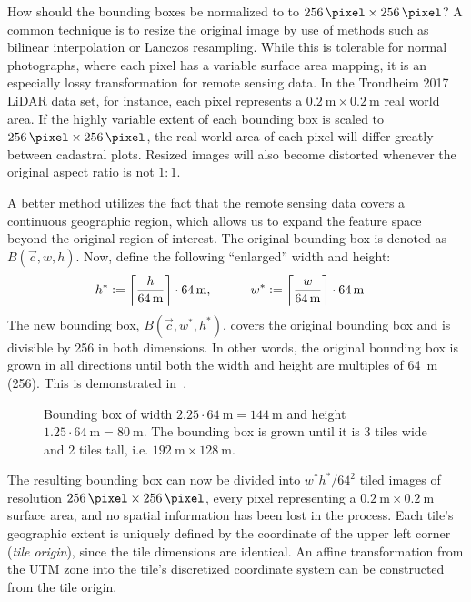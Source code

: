 How should the bounding boxes be normalized to to $\SI{256}{\pixel} \times \SI{256}{\pixel}$?
A common technique is to resize the original image by use of methods such as bilinear interpolation or Lanczos resampling.
While this is tolerable for normal photographs, where each pixel has a variable surface area mapping, it is an especially lossy transformation for remote sensing data.
In the Trondheim 2017 LiDAR data set, for instance, each pixel represents a $\SI{0.2}{\meter} \times \SI{0.2}{\meter}$ real world area.
If the highly variable extent of each bounding box is scaled to $\SI{256}{\pixel} \times \SI{256}{\pixel}$, the real world area of each pixel will differ greatly between cadastral plots.
Resized images will also become distorted whenever the original aspect ratio is not $1:1$.

A better method utilizes the fact that the remote sensing data covers a continuous geographic region, which allows us to expand the feature space beyond the original region of interest.
The original bounding box is denoted as $B(\vec{c}, w, h)$.
Now, define the following \enquote{enlarged} width and height:
%
\begin{align*}
  h^* &:= \left\lceil \frac{h}{\SI{64}{\meter}} \right\rceil \cdot \SI{64}{\meter},
  \hspace{3em}
  w^* := \left\lceil \frac{w}{\SI{64}{\meter}} \right\rceil \cdot \SI{64}{\meter}
\end{align*}
%
The new bounding box, $B(\vec{c}, w^*, h^*)$, covers the original bounding box and is divisible by \SI{256}{\pixel} in both dimensions.
In other words, the original bounding box is grown in all directions until both the width and height are multiples of \SI{64}{\meter} (\SI{256}{\pixel}).
This is demonstrated in~.

\begin{figure}[H]
  \centering
  
  \caption{%
    Bounding box of width $2.25 \cdot \SI{64}{\meter} = \SI{144}{\meter}$ and height $1.25 \cdot \SI{64}{\meter} = \SI{80}{\meter}$.
    The bounding box is grown until it is 3 tiles wide and 2 tiles tall, i.e. $\SI{192}{\meter} \times \SI{128}{\meter}$.
  }%
  \label{fig:bbox-growing}
\end{figure}

The resulting bounding box can now be divided into $w^*h^* / 64^2$ tiled images of resolution $\SI{256}{\pixel} \times \SI{256}{\pixel}$, every pixel representing a $\SI{0.2}{\meter} \times \SI{0.2}{\meter}$ surface area, and no spatial information has been lost in the process.
Each tile's geographic extent is uniquely defined by the coordinate of the upper left corner (\textit{tile origin}), since the tile dimensions are identical.
An affine transformation from the UTM zone into the tile's discretized coordinate system can be constructed from the tile origin.

